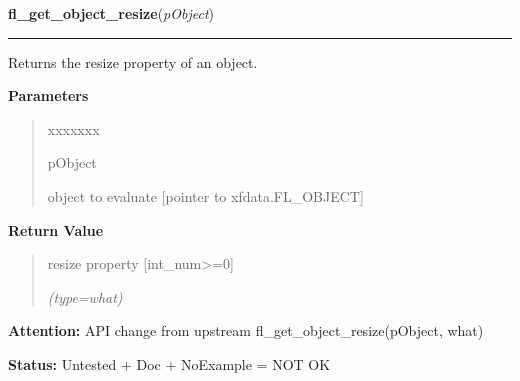 \hspace{.8\funcindent}\begin{boxedminipage}{\funcwidth}

    \raggedright \textbf{fl\_get\_object\_resize}(\textit{pObject})

    \vspace{-1.5ex}

    \rule{\textwidth}{0.5\fboxrule}
\setlength{\parskip}{2ex}
    Returns the resize property of an object.

\setlength{\parskip}{1ex}
      \textbf{Parameters}
      \vspace{-1ex}

      \begin{quote}
        \begin{Ventry}{xxxxxxx}

          \item[pObject]

          object to evaluate [pointer to xfdata.FL\_OBJECT]

        \end{Ventry}

      \end{quote}

      \textbf{Return Value}
    \vspace{-1ex}

      \begin{quote}
      resize property [int\_num{\textgreater}=0]

      {\it (type=what)}

      \end{quote}

\textbf{Attention:} API change from upstream fl\_get\_object\_resize(pObject, what)



\textbf{Status:} Untested + Doc + NoExample = NOT OK



    \end{boxedminipage}

    \label{xformslib:library:fl_set_object_gravity}

    \vspace{0.5ex}


